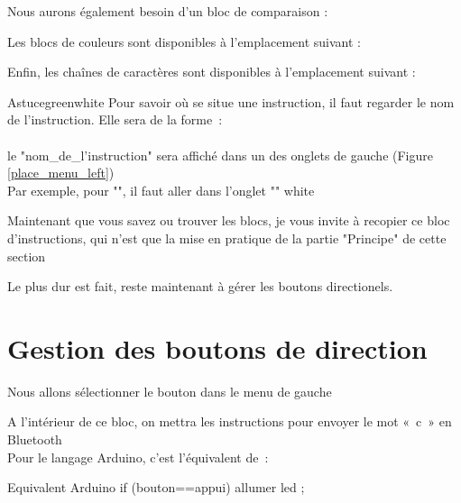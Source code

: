 
Nous aurons également besoin d'un bloc de comparaison : 



Les blocs de couleurs sont disponibles à l'emplacement suivant : 



Enfin, les chaînes de caractères sont disponibles à l'emplacement suivant : 



\begin{messageBox}{Astuce}{green}{white}{
Pour savoir où se situe une instruction, il faut
regarder le nom de l'instruction. Elle sera de la forme : \\

 \\

le "nom\_de\_l'instruction" sera affiché dans un des onglets de gauche (Figure  \ref{place_menu_left}) \\
Par exemple, pour "", il faut aller dans l'onglet "" 
}{white}
\end{messageBox}


Maintenant que vous savez ou trouver les blocs, je vous invite à recopier ce bloc d'instructions, qui n'est que la mise en pratique de la partie "Principe" de cette section


Le plus dur est fait, reste maintenant à gérer les boutons directionels.

\section{Gestion des boutons de direction}

Nous allons sélectionner le bouton  dans le menu de gauche

 A l'intérieur de ce bloc, on mettra les instructions pour envoyer le mot « c » en Bluetooth \\
Pour le langage Arduino, c'est l'équivalent de :

\begin{Cpp}{Equivalent Arduino}
if (bouton==appui) {allumer led ;}     
\end{Cpp}
	        
